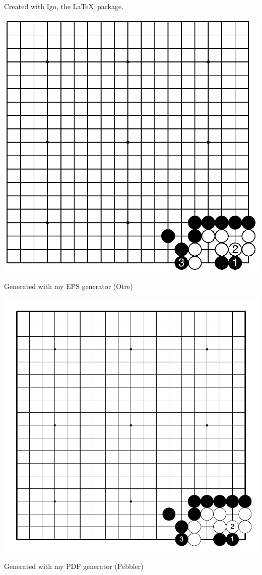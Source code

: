 \documentclass{article}
\begin{document}
\begin{center}
\normalgoban\showfullgoban

Created with Igo, the \LaTeX\ package.
\end{center}


\begin{center}
\includegraphics[scale=1]{ggg-easy-01.eps}

Generated with my EPS generator (Otre)
\end{center}

\begin{center}
\includegraphics[scale=0.7]{ggg-easy-01_1.pdf}

Generated with my PDF generator (Pebbler)
\end{center}
\end{document}
